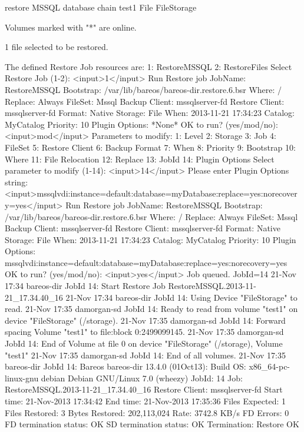 \begin{bconsole}{restore MSSQL database chain}
    test1                     File                      FileStorage

Volumes marked with "*" are online.


1 file selected to be restored.

The defined Restore Job resources are:
     1: RestoreMSSQL
     2: RestoreFiles
Select Restore Job (1-2): <input>1</input>
Run Restore job
JobName:         RestoreMSSQL
Bootstrap:       /var/lib/bareos/bareos-dir.restore.6.bsr
Where:           /
Replace:         Always
FileSet:         Mssql
Backup Client:   mssqlserver-fd
Restore Client:  mssqlserver-fd
Format:          Native
Storage:         File
When:            2013-11-21 17:34:23
Catalog:         MyCatalog
Priority:        10
Plugin Options:  *None*
OK to run? (yes/mod/no): <input>mod</input>
Parameters to modify:
     1: Level
     2: Storage
     3: Job
     4: FileSet
     5: Restore Client
     6: Backup Format
     7: When
     8: Priority
     9: Bootstrap
    10: Where
    11: File Relocation
    12: Replace
    13: JobId
    14: Plugin Options
Select parameter to modify (1-14): <input>14</input>
Please enter Plugin Options string: <input>mssqlvdi:instance=default:database=myDatabase:replace=yes:norecovery=yes</input>
Run Restore job
JobName:         RestoreMSSQL
Bootstrap:       /var/lib/bareos/bareos-dir.restore.6.bsr
Where:           /
Replace:         Always
FileSet:         Mssql
Backup Client:   mssqlserver-fd
Restore Client:  mssqlserver-fd
Format:          Native
Storage:         File
When:            2013-11-21 17:34:23
Catalog:         MyCatalog
Priority:        10
Plugin Options:  mssqlvdi:instance=default:database=myDatabase:replace=yes:norecovery=yes
OK to run? (yes/mod/no): <input>yes</input>
Job queued. JobId=14
21-Nov 17:34 bareos-dir JobId 14: Start Restore Job RestoreMSSQL.2013-11-21_17.34.40_16
21-Nov 17:34 bareos-dir JobId 14: Using Device "FileStorage" to read.
21-Nov 17:35 damorgan-sd JobId 14: Ready to read from volume "test1" on device "FileStorage" (/storage).
21-Nov 17:35 damorgan-sd JobId 14: Forward spacing Volume "test1" to file:block 0:2499099145.
21-Nov 17:35 damorgan-sd JobId 14: End of Volume at file 0 on device "FileStorage" (/storage), Volume "test1"
21-Nov 17:35 damorgan-sd JobId 14: End of all volumes.
21-Nov 17:35 bareos-dir JobId 14: Bareos bareos-dir 13.4.0 (01Oct13):
  Build OS:               x86_64-pc-linux-gnu debian Debian GNU/Linux 7.0 (wheezy)
  JobId:                  14
  Job:                    RestoreMSSQL.2013-11-21_17.34.40_16
  Restore Client:         mssqlserver-fd
  Start time:             21-Nov-2013 17:34:42
  End time:               21-Nov-2013 17:35:36
  Files Expected:         1
  Files Restored:         3
  Bytes Restored:         202,113,024
  Rate:                   3742.8 KB/s
  FD Errors:              0
  FD termination status:  OK
  SD termination status:  OK
  Termination:            Restore OK
\end{bconsole}
\hide{$}


